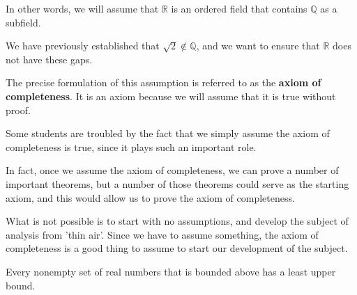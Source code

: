 In other words, we will assume that $\mathbb{R}$ is an ordered field that contains $\mathbb{Q}$ as a subfield.
\par\vspace{0.3 cm}
We have previously established that $\sqrt{2}\notin\mathbb{Q}$, and we want to ensure that $\mathbb{R}$ does not have these gaps.
\par\vspace{0.3 cm}
The precise formulation of this assumption is referred to as the \textbf{axiom of completeness}.  It is an axiom because we will assume that it is true without proof.
\par\vspace{0.3 cm}
Some students are troubled by the fact that we simply assume the axiom of completeness is true, since it plays such an important role.
\par\vspace{0.3 cm}
In fact, once we assume the axiom of completeness, we can prove a number of important theorems, but a number of those theorems could serve as the starting axiom, and this would allow us to prove the axiom of completeness.
\par\vspace{0.3 cm}
What is not possible is to start with no assumptions, and develop the subject of analysis from 'thin air'.  Since we have to assume something, the axiom of completeness is a good thing to assume to start our development of the subject.
\par\vspace{0.3 cm}
\begin{axiom} Every nonempty set of real numbers that is bounded above has a least upper bound.
\end{axiom}
